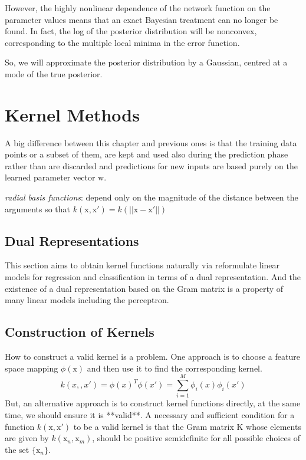 \documentclass[a4paper]{book}
\begin{document}
However, the highly nonlinear dependence of the network function on the parameter values means
that an exact Bayesian treatment can no longer be found. In fact, the log of the posterior distribution will be nonconvex, corresponding to the multiple local minima in the error function.

So, we will approximate the posterior distribution by a Gaussian, centred at a mode of the true posterior.

\section{Kernel Methods}
A big difference between this chapter and previous ones is that the training data points or a subset of them, are kept and used also during the prediction phase rather than are discarded and predictions for new inputs are based purely on the learned parameter vector $\mathrm w$.

\textit{radial basis functions}: depend only on the magnitude of the distance  between the arguments so that $k(\mathrm x,\mathrm x') = k(||\mathrm x-\mathrm x'||)$
\subsection{Dual Representations}
This section aims to obtain kernel functions naturally via reformulate linear models for regression and classification in terms of a dual representation.  And the existence of a dual representation based on the Gram matrix is a property of many linear models including the perceptron.
\subsection{ Construction of Kernels}
How to construct a valid kernel is a problem. One approach is to choose a feature space mapping $\phi(\mathrm x)$ and then use it to find the corresponding  kernel.
\begin{equation}
  k(x, ,x') = \phi(x)^T\phi(x') = \sum_{i=1}^M\phi_i(x)\phi_i(x')
\end{equation}
But, an alternative approach is to construct kernel functions directly, at the same time, we should ensure it is **valid**.  A necessary and sufficient condition for a function $k(\mathrm x, \mathrm  x') $ to be a valid kernel is that the Gram matrix $\mathrm  K$ whose elements are given by $k(\mathrm  x_n,\mathrm  x_m)$, should be positive semidefinite for all possible choices of the set $\{\mathrm  x_n\}$.
\end{document}
